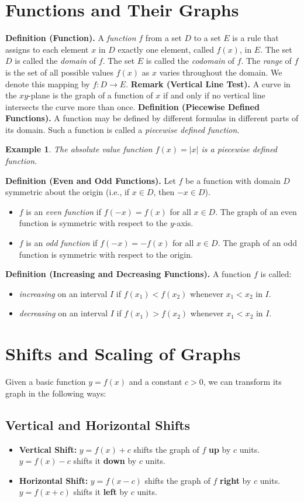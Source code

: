\documentclass[11pt,a4paper]{article}
\newtheorem{example}{Example}
\begin{document}
\section{Functions and Their Graphs}
\textbf{Definition (Function).} A \textit{function} $f$ from a set $D$ to a set $E$ is a rule that assigns to each element $x$ in $D$ exactly one element, called $f(x)$, in $E$. The set $D$ is called the \textit{domain} of $f$. The set $E$ is called the \textit{codomain} of $f$. The \textit{range} of $f$ is the set of all possible values $f(x)$ as $x$ varies throughout the domain. We denote this mapping by $f: D \to E$.
\textbf{Remark (Vertical Line Test).} A curve in the $xy$-plane is the graph of a function of $x$ if and only if no vertical line intersects the curve more than once.
\textbf{Definition (Piecewise Defined Functions).} A function may be defined by different formulas in different parts of its domain. Such a function is called a \textit{piecewise defined function}.
\begin{example}
The absolute value function $f(x) = |x|$ is a piecewise defined function.
\end{example}
\textbf{Definition (Even and Odd Functions).} Let $f$ be a function with domain $D$ symmetric about the origin (i.e., if $x \in D$, then $-x \in D$).
\begin{itemize}
\item $f$ is an \textit{even function} if $f(-x) = f(x)$ for all $x \in D$. The graph of an even function is symmetric with respect to the $y$-axis.
\item $f$ is an \textit{odd function} if $f(-x) = -f(x)$ for all $x \in D$. The graph of an odd function is symmetric with respect to the origin.
\end{itemize}
\textbf{Definition (Increasing and Decreasing Functions).} A function $f$ is called:
\begin{itemize}
\item \textit{increasing} on an interval $I$ if $f(x_1) < f(x_2)$ whenever $x_1 < x_2$ in $I$.
\item \textit{decreasing} on an interval $I$ if $f(x_1) > f(x_2)$ whenever $x_1 < x_2$ in $I$.
\end{itemize}
\section{Shifts and Scaling of Graphs}
Given a basic function $y = f(x)$ and a constant $c > 0$, we can transform its graph in the following ways:
\subsection{Vertical and Horizontal Shifts}
\begin{itemize}
\item \textbf{Vertical Shift:} $y = f(x) + c$ shifts the graph of $f$ \textbf{up} by $c$ units. $y = f(x) - c$ shifts it \textbf{down} by $c$ units.
\item \textbf{Horizontal Shift:} $y = f(x - c)$ shifts the graph of $f$ \textbf{right} by $c$ units. $y = f(x + c)$ shifts it \textbf{left} by $c$ units.
\end{itemize}
\end{document}
